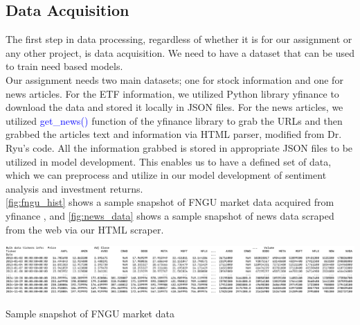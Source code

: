 \documentclass[twocolumn,12pt]{article}
\makeatletter
\newenvironment{figurehere}
  {\def\@captype{figure}}
  {}
\makeatother
\begin{document}
\begin{multicols}{2}
\begin{flushleft}
	\subsection{Data Acquisition} \label{data_acquisition}
	The first step in data processing, regardless of whether it is for our assignment or any other project, is data acquisition. We need to have a dataset that can be used to train need based models.\\
	Our assignment needs two main datasets; one for stock information and one for news articles. For the ETF information, we utilized Python library yfinance \cite{yfin} to download the data and stored it locally in JSON files. For the news articles, we utilized \textcolor{blue}{get\_news()} function of the yfinance library \cite{yfin} to grab the URLs and then grabbed the articles text and information via HTML parser, modified from Dr. Ryu's \cite{cryu} code. All the information grabbed is stored in appropriate JSON files to be utilized in model development. This enables us to have a defined set of data, which we can preprocess and utilize in our model development of sentiment analysis and investment returns.\\
	\cref{fig:fngu_hist} shows a sample snapshot of FNGU market data acquired from yfinance \cite{yfin}, and \cref{fig:news_data} shows a sample snapshot of news data scraped from the web via our HTML scraper.
	
	\mbox{}
	\begin{figurehere}
		\centering
		\includegraphics[width=\linewidth]{images/fngu_hist.png}
		\caption{Sample snapshot of FNGU market data}
		\label{fig:fngu_hist}
	\end{figurehere}
	

\end{flushleft}
\end{multicols}
\end{document}

